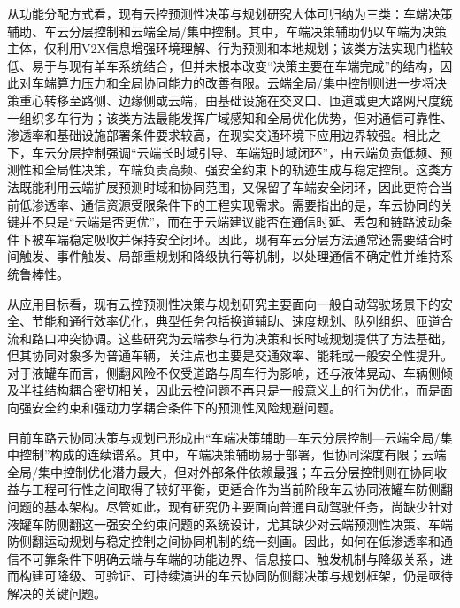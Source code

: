       从功能分配方式看，现有云控预测性决策与规划研究大体可归纳为三类：车端决策辅助、车云分层控制和云端全局/集中控制\cite{Huang2025V2X}。其中，车端决策辅助仍以车端为决策主体，仅利用V2X信息增强环境理解、行为预测和本地规划\cite{UniV2X2024,UniMM_V2X2025,V2X_VLM2025}；该类方法实现门槛较低、易于与现有单车系统结合，但并未根本改变“决策主要在车端完成”的结构，因此对车端算力压力和全局协同能力的改善有限。云端全局/集中控制则进一步将决策重心转移至路侧、边缘侧或云端，由基础设施在交叉口、匝道或更大路网尺度统一组织多车行为\cite{Kherroubi2024AUTODRAITEC,Lu2024EdgeComputing,Typaldos2025Cooperative,Yang2025CloudBased,Wang2025Cooperative,shijia2024rampcloud}；该类方法最能发挥广域感知和全局优化优势，但对通信可靠性、渗透率和基础设施部署条件要求较高，在现实交通环境下应用边界较强。相比之下，车云分层控制强调“云端长时域引导、车端短时域闭环”，由云端负责低频、预测性和全局性决策，车端负责高频、强安全约束下的轨迹生成与稳定控制\cite{Gao2025V2X,hans2024,chenqien2023cpccbus,lishuyan2022pccheavytrucks,wangluyao2024cloudpacc,wangzhou2023hierarchical,meirun2023platoon,jiangyu2023lc}。这类方法既能利用云端扩展预测时域和协同范围，又保留了车端安全闭环，因此更符合当前低渗透率、通信资源受限条件下的工程实现需求。需要指出的是，车云协同的关键并不只是“云端是否更优”，而在于云端建议能否在通信时延、丢包和链路波动条件下被车端稳定吸收并保持安全闭环\cite{xionglu2024_CVIS_survay,xuqing2021unreliable,wang2021platoonmpc}。因此，现有车云分层方法通常还需要结合时间触发、事件触发、局部重规划和降级执行等机制，以处理通信不确定性并维持系统鲁棒性\cite{hans2024,wang2021platoonmpc}。

      从应用目标看，现有云控预测性决策与规划研究主要面向一般自动驾驶场景下的安全、节能和通行效率优化，典型任务包括换道辅助、速度规划、队列组织、匝道合流和路口冲突协调\cite{chenqien2023cpccbus,wangzhou2023hierarchical,meirun2023platoon,Typaldos2025Cooperative,Yang2025CloudBased}。这些研究为云端参与行为决策和长时域规划提供了方法基础，但其协同对象多为普通车辆，关注点也主要是交通效率、能耗或一般安全性提升。对于液罐车而言，侧翻风险不仅受道路与周车行为影响，还与液体晃动、车辆侧倾及半挂结构耦合密切相关，因此云控问题不再只是一般意义上的行为优化，而是面向强安全约束和强动力学耦合条件下的预测性风险规避问题。

      目前车路云协同决策与规划已形成由“车端决策辅助—车云分层控制—云端全局/集中控制”构成的连续谱系。其中，车端决策辅助易于部署，但协同深度有限；云端全局/集中控制优化潜力最大，但对外部条件依赖最强；车云分层控制则在协同收益与工程可行性之间取得了较好平衡，更适合作为当前阶段车云协同液罐车防侧翻问题的基本架构。尽管如此，现有研究仍主要面向普通自动驾驶任务，尚缺少针对液罐车防侧翻这一强安全约束问题的系统设计，尤其缺少对云端预测性决策、车端防侧翻运动规划与稳定控制之间协同机制的统一刻画。因此，如何在低渗透率和通信不可靠条件下明确云端与车端的功能边界、信息接口、触发机制与降级关系，进而构建可降级、可验证、可持续演进的车云协同防侧翻决策与规划框架，仍是亟待解决的关键问题。

